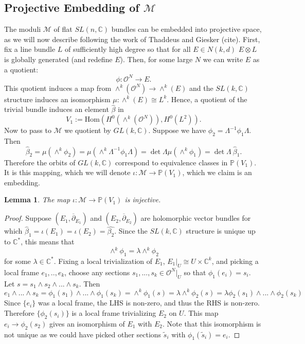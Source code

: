 \documentclass[]{article}
\newtheorem{lemma}{Lemma}
\newcommand{\C}{\mathbb{C}}
\newcommand{\Hom}{\text{Hom}}
\newcommand{\OO}{\mathcal{O}}
\newcommand{\MM}{\mathcal{M}}
\newcommand{\dbar}{\overline{\partial}}
\newcommand{\PP}{\mathbb{P}}
\begin{document}
	\subsection{Projective Embedding of $\MM$}
	\label{s:m-embedding}
	The moduli $\MM$ of flat $SL(n,\C)$ bundles can be embedded into projective space, as we will now describe following the work of Thaddeus and Giesker (cite). First, fix a line bundle $L$ of sufficiently high degree so that for all $E\in N(k,d)$ $E\otimes L$  is globally generated (and redefine $E$). Then, for some large $N$ we can write $E$ as a quotient:
	\begin{equation}
	\phi:\OO^N \to E.
	\end{equation}
	This quotient induces a map from $\wedge^k(\OO^N) \to \wedge^k(E)$ and the $SL(k,\C)$ structure induces an isomorphism $\mu:\wedge^k(E)\cong L^k$. Hence, a quotient of the trivial bundle induces an element $\hat{\beta}$ in 
	\begin{equation}
	V_1 := \Hom(H^0(\wedge^k(\OO^N)), H^0(L^2)).
	\end{equation}
	Now to pass to $\MM$ we quotient by $GL(k,\C)$. Suppose we have $\phi_2 = \Lambda^{-1} \phi_1 \Lambda$. Then
	\begin{equation}
		\hat{\beta}_2 = \mu(\wedge^k \phi_2) = \mu(\wedge^k \Lambda^{-1}\phi_1 \Lambda) = \det\Lambda \mu(\wedge^k \phi_1) = \det\Lambda~ \hat{\beta}_1.
	\end{equation}
	Therefore the orbits of $GL(k,\C)$ correspond to equivalence classes in $\PP(V_1)$. It is this mapping, which we will denote $\iota:\MM\to \PP(V_1)$, which we claim is an embedding. 
	\begin{lemma}
		The map $\iota:\MM \to \PP(V_1)$ is injective.
	\end{lemma}
	\begin{proof}
		 Suppose $(E_1, \dbar_{E_1})$ and $(E_2, \dbar_{E_2})$ are holomorphic vector bundles for which $\hat{\beta}_1 = \iota(E_1) = \iota(E_2) = \hat{\beta_2}$. Since the $SL(k,\C)$ structure is unique up to $\C^\ast$, this means that
		\begin{equation}
		\wedge^k \phi_1 = \lambda \wedge^k \phi_2
		\end{equation}
		for some $\lambda \in \C^\ast$. Fixing a local trivialization of $E_1$, $E_1|_U \cong U\times \C^k$, and picking a local frame $e_1,..,e_k$, choose any sections $s_1,...,s_k \in \OO^N|_{U}$ so that $\phi_1(e_i) = s_i$. Let $s = s_1 \wedge s_2 \wedge ... \wedge s_k$. Then
		\begin{equation}
		e_1\wedge...\wedge s_k=\phi_1(s_1)\wedge...\wedge \phi_1(s_k)= \wedge^k \phi_1(s) = \lambda \wedge^k \phi_2(s) = \lambda \phi_2(s_1)\wedge...\wedge \phi_2(s_k)
		\end{equation}
		Since $\{e_i\}$ was a local frame, the LHS is non-zero, and thus the RHS is non-zero. Therefore $\{\phi_2(s_i)\}$ is a local frame trivializing $E_2$ on $U$. This map $e_i \to \phi_2(s_2)$ gives an isomorphism of $E_1$ with $E_2$. Note that this isomorphism is not unique as we could have picked other sections $\tilde{s}_i$ with $\phi_1(\tilde{s}_i) = e_i$.
	\end{proof}
\end{document}

